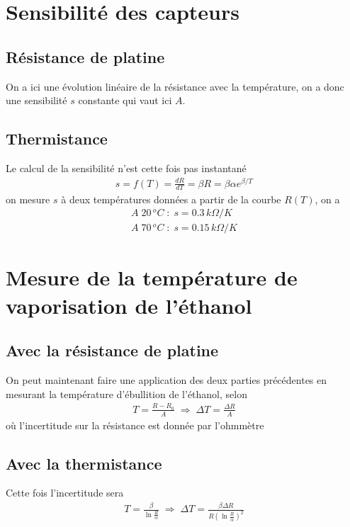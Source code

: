 \documentclass[12pt,prb,aps,epsf]{report}
\begin{document}
\section{Sensibilité des capteurs}

\subsection{Résistance de platine}
On a ici une évolution linéaire de la résistance avec la température, on a donc une sensibilité $s$ constante qui vaut ici $A$.
\subsection{Thermistance}
Le calcul de la sensibilité n'est cette fois pas instantané 
\begin{eqnarray}
s = f(T) = \frac{dR}{dT} = \beta R = \beta \alpha e^{\beta/T}
\end{eqnarray}
on mesure $s$ à deux températures données a partir de la courbe $R(T)$, on a 
\begin{eqnarray}
A\;20\,^oC\; : \; s = 0.3 \,k\Omega /K \\
A\;70\,^oC\; : \; s = 0.15 \,k\Omega /K 
\end{eqnarray}

\section{Mesure de la température de vaporisation de l'éthanol}

\subsection{Avec la résistance de platine}
On peut maintenant faire une application des deux parties précédentes en mesurant la température d'ébullition de l'éthanol, selon
\begin{eqnarray}
T = \frac{R-R_0}{A} \; \Rightarrow \; \Delta T =\frac{\Delta R}{A}
\end{eqnarray}
où l'incertitude sur la résistance est donnée par l'ohmmètre
\subsection{Avec la thermistance}
Cette fois l'incertitude sera 
\begin{eqnarray}
T = \frac{\beta}{\ln \frac{R}{\alpha}} \; \Rightarrow \; \Delta T = \frac{\beta \Delta R}{R (\ln \frac{R}{\alpha})^2}
\end{eqnarray}
\end{document}
